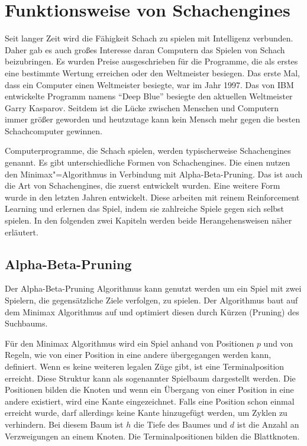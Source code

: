 \section{Funktionsweise von Schachengines}
Seit langer Zeit wird die Fähigkeit Schach zu spielen mit Intelligenz verbunden.
Daher gab es auch großes Interesse daran Computern das Spielen von Schach beizubringen.
Es wurden Preise ausgeschrieben für die Programme, die als erstes eine bestimmte Wertung erreichen oder den Weltmeister besiegen. Das erste Mal, dass ein Computer einen Weltmeister besiegte, war im Jahr 1997. Das von IBM entwickelte Programm namens \enquote{Deep Blue} besiegte den aktuellen Weltmeister Garry Kasparov. Seitdem ist die Lücke zwischen Menschen und Computern immer größer geworden und heutzutage kann kein Mensch mehr gegen die besten Schachcomputer gewinnen.
\cite{vjekoslav_nemec_history_2019}

Computerprogramme, die Schach spielen, werden typischerweise Schachengines genannt. Es gibt unterschiedliche Formen von Schachengines. Die einen nutzen den Minimax"=Algorithmus in Verbindung mit Alpha-Beta-Pruning. Das ist auch die Art von Schachengines, die zuerst entwickelt wurden. Eine weitere Form wurde in den letzten Jahren entwickelt. Diese arbeiten mit reinem Reinforcement Learning und erlernen das Spiel, indem sie zahlreiche Spiele gegen sich selbst spielen. In den folgenden zwei Kapiteln werden beide Herangehensweisen näher erläutert.

\subsection{Alpha-Beta-Pruning}
Der Alpha-Beta-Pruning Algorithmus kann genutzt werden um ein Spiel mit zwei Spielern, die gegensätzliche Ziele verfolgen, zu spielen. Der Algorithmus baut auf dem Minimax Algorithmus auf und optimiert diesen durch Kürzen (Pruning) des Suchbaums.

Für den Minimax Algorithmus wird ein Spiel anhand von Positionen $p$ und von Regeln, wie von einer Position in eine andere übergegangen werden kann, definiert. Wenn es keine weiteren legalen Züge gibt, ist eine Terminalposition erreicht. Diese Struktur kann als sogenannter Spielbaum dargestellt werden. Die Positionen bilden die Knoten und wenn ein Übergang von einer Position in eine andere existiert, wird eine Kante eingezeichnet. Falls eine Position schon einmal erreicht wurde, darf allerdings keine Kante hinzugefügt werden, um Zyklen zu verhindern. Bei diesem Baum ist $h$ die Tiefe des Baumes und $d$ ist die Anzahl an Verzweigungen an einem Knoten. Die Terminalpositionen bilden die Blattknoten.
\cite{knuth_analysis_1975}

